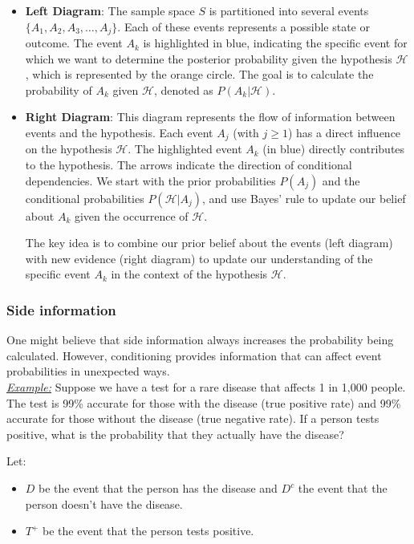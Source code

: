 \documentclass[a4paper,10pt]{article}
\newcommand{\hlti}[1]{\colorbox{color1}{#1}}
\begin{document}
\begin{itemize}
    \item \textbf{Left Diagram}: The sample space \( S \) is partitioned into several events \( \{A_1, A_2, A_3, \ldots, A_j\} \). Each of these events represents a possible state or outcome. The event \( A_k \) is highlighted in blue, indicating the specific event for which we want to determine the posterior probability given the hypothesis \( \mathcal{H} \), which is represented by the orange circle. The goal is to calculate the probability of \( A_k \) given \( \mathcal{H} \), denoted as \( P(A_k | \mathcal{H}) \).

    \item \textbf{Right Diagram}: This diagram represents the flow of information between events and the hypothesis. Each event \( A_j \) (with \( j \geq 1 \)) has a direct influence on the hypothesis \( \mathcal{H} \). The highlighted event \( A_k \) (in blue) directly contributes to the hypothesis. The arrows indicate the direction of conditional dependencies. We start with the prior probabilities \( P(A_j) \) and the conditional probabilities \( P(\mathcal{H} | A_j) \), and use Bayes' rule to update our belief about \( A_k \) given the occurrence of \( \mathcal{H} \).

    The key idea is to combine our prior belief about the events (left diagram) with new evidence (right diagram) to update our understanding of the specific event \( A_k \) in the context of the hypothesis \( \mathcal{H} \).
\end{itemize}

\subsubsection{Side information}

One might believe that side information always increases the probability being calculated. However, conditioning provides information that can affect event probabilities in \hlti{unexpected} ways.\\

\noindent\textit{\underline{Example:}} Suppose we have a test for a rare disease that affects 1 in 1,000 people. The test is 99\% accurate for those with the disease (true positive rate) and 99\% accurate for those without the disease (true negative rate). If a person tests positive, what is the probability that they actually have the disease?

Let:
\begin{itemize}
    \item $D$ be the event that the person has the disease and $D^c$ the event that the person doesn't have the disease.
    \item $T^+$ be the event that the person tests positive.
\end{itemize}
\end{document}
